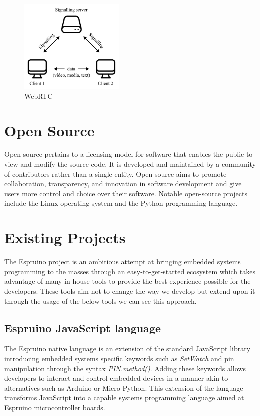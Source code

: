 \documentclass{l4proj}
\begin{document}
\begin{figure}[!ht]
    \centering
    \includegraphics[width=5cm]{dissertation/images/web-rtc-diagram.png}
    \caption{WebRTC}
    \label{fig:webRTC}
\end{figure}

\section{Open Source}
\text Open source pertains to a licensing model for software that enables the public to view and modify the source code. It is developed and maintained by a community of contributors rather than a single entity. Open source aims to promote collaboration, transparency, and innovation in software development and give users more control and choice over their software. Notable open-source projects include the Linux operating system and the Python programming language.

\section{Existing Projects}
\text The Espruino project is an ambitious attempt at bringing embedded systems programming to the masses through an easy-to-get-started ecosystem which takes advantage of many in-house tools to provide the best experience possible for the developers. These tools aim not to change the way we develop but extend upon it through the usage of the below tools we can see this approach.

\subsection{Espruino JavaScript language}
The \href{https://www.espruino.com/Reference#top}{Espruino native language} is an extension of the standard JavaScript library introducing embedded systems specific keywords such as \textit{SetWatch} and pin manipulation through the syntax \textit{PIN.method()}. Adding these keywords allows developers to interact and control embedded devices in a manner akin to alternatives such as Arduino or Micro Python. This extension of the language transforms JavaScript into a capable systems programming language aimed at Espruino microcontroller boards.
\end{document}
